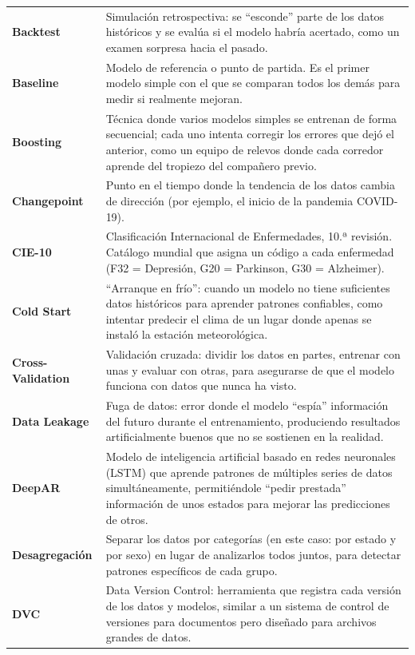 \documentclass[12pt, letterpaper]{article}
\begin{document}
\begin{longtable}{>{\bfseries\small}p{3.8cm} p{11.5cm}}
Backtest & Simulación retrospectiva: se ``esconde'' parte de los datos históricos y se evalúa si el modelo habría acertado, como un examen sorpresa hacia el pasado. \\
\addlinespace
Baseline & Modelo de referencia o punto de partida. Es el primer modelo simple con el que se comparan todos los demás para medir si realmente mejoran. \\
\addlinespace
Boosting & Técnica donde varios modelos simples se entrenan de forma secuencial; cada uno intenta corregir los errores que dejó el anterior, como un equipo de relevos donde cada corredor aprende del tropiezo del compañero previo. \\
\addlinespace
Changepoint & Punto en el tiempo donde la tendencia de los datos cambia de dirección (por ejemplo, el inicio de la pandemia COVID-19). \\
\addlinespace
CIE-10 & Clasificación Internacional de Enfermedades, 10.ª revisión. Catálogo mundial que asigna un código a cada enfermedad (F32 = Depresión, G20 = Parkinson, G30 = Alzheimer). \\
\addlinespace
Cold Start & ``Arranque en frío'': cuando un modelo no tiene suficientes datos históricos para aprender patrones confiables, como intentar predecir el clima de un lugar donde apenas se instaló la estación meteorológica. \\
\addlinespace
Cross-Validation & Validación cruzada: dividir los datos en partes, entrenar con unas y evaluar con otras, para asegurarse de que el modelo funciona con datos que nunca ha visto. \\
\addlinespace
Data Leakage & Fuga de datos: error donde el modelo ``espía'' información del futuro durante el entrenamiento, produciendo resultados artificialmente buenos que no se sostienen en la realidad. \\
\addlinespace
DeepAR & Modelo de inteligencia artificial basado en redes neuronales (LSTM) que aprende patrones de múltiples series de datos simultáneamente, permitiéndole ``pedir prestada'' información de unos estados para mejorar las predicciones de otros. \\
\addlinespace
Desagregación & Separar los datos por categorías (en este caso: por estado y por sexo) en lugar de analizarlos todos juntos, para detectar patrones específicos de cada grupo. \\
\addlinespace
DVC & Data Version Control: herramienta que registra cada versión de los datos y modelos, similar a un sistema de control de versiones para documentos pero diseñado para archivos grandes de datos. \\

\end{longtable}
\end{document}
